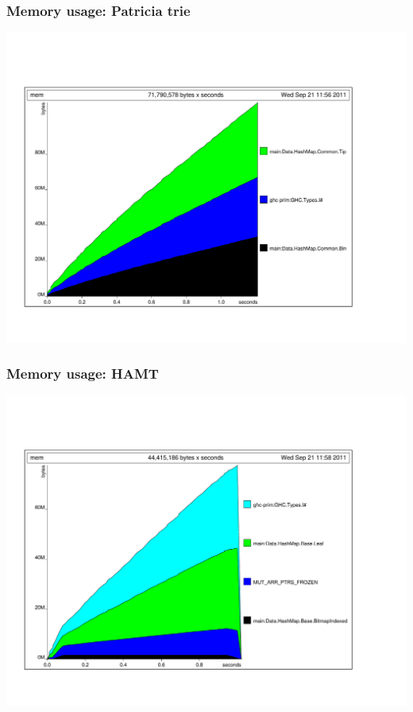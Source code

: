 \documentclass[xetex,mathserif,serif]{beamer}
\begin{document}
\begin{frame}
  \frametitle{Memory usage: Patricia trie}
  \includegraphics[angle=90,width=\textwidth]{patricia-mem.pdf}
\end{frame}

\begin{frame}
  \frametitle{Memory usage: HAMT}
  \includegraphics[angle=90,width=\textwidth]{hamt-mem.pdf}
\end{frame}
\end{document}
